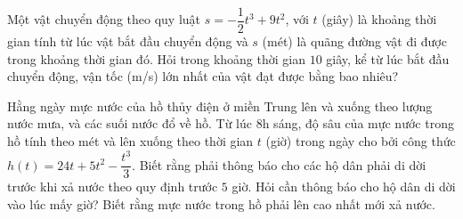 \begin{ex}%
	Một vật chuyển động theo quy luật $s=-\dfrac12t^3+9t^2$, với $t$ (giây) là khoảng thời gian tính từ lúc vật bắt đầu chuyển động và $s$ (mét) là quãng đường vật đi được trong khoảng thời gian đó. Hỏi trong khoảng thời gian $10$ giây, kể từ lúc bắt đầu chuyển động, vận tốc (m/s) lớn nhất của vật đạt được bằng bao nhiêu?
	
\end{ex}

\begin{ex}%
	Hằng ngày mực nước của hồ thủy điện ở miền Trung lên và xuống theo lượng nước mưa, và các suối nước đổ về hồ. Từ lúc $8$h sáng, độ sâu của mực nước trong hồ tính theo mét và lên xuống theo thời gian $t$ (giờ) trong ngày cho bởi công thức $h(t)=24t+5t^2-\dfrac{t^3}{3}$. Biết rằng phải thông báo cho các hộ dân phải di dời trước khi xả nước theo quy định trước $5$ giờ. Hỏi cần thông báo cho hộ dân di dời vào lúc mấy giờ? Biết rằng mực nước trong hồ phải lên cao nhất mới xả nước.
\end{ex}

